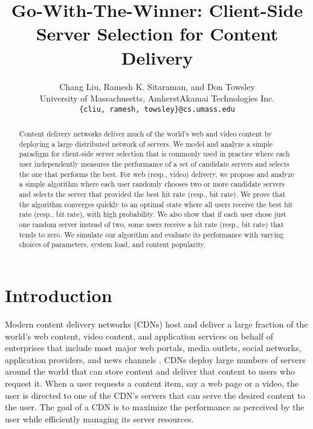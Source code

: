 \documentclass[conference]{IEEEtran}
\begin{document}
\title{Go-With-The-Winner: Client-Side Server Selection for Content Delivery}

\author{Chang Liu, Ramesh K. Sitaraman, and Don Towsley\\
University of Massachusetts, Amherst\hspace{0.2in}Akamai Technologies Inc.\\
\texttt{\{cliu, ramesh, towsley\}@cs.umass.edu}}



\maketitle

\begin{abstract}
Content delivery networks deliver much of the world's web and video content by deploying a large distributed network of servers. We model and analyze a simple paradigm for client-side server selection that is commonly used in practice  where each user independently measures the performance of a set of candidate servers and selects the one that performs the best. For web (resp., video) delivery, we propose and analyze a simple algorithm where each user randomly chooses two or more candidate servers and selects the server that provided the best hit rate (resp., bit rate). We prove that the algorithm converges quickly to an optimal state where all users receive the best hit rate (resp., bit rate), with high probability. We also show that if each user chose just one random server instead of two,  some users receive a hit rate (resp., bit rate) that tends to zero. We simulate our algorithm and evaluate its performance with varying choices of parameters, system load, and content popularity. 
\end{abstract}

\section{Introduction}
Modern content delivery networks (CDNs) host and deliver a large fraction of  the world's  web content, video content, and application services on behalf of enterprises that include most major web portals, media outlets, social networks, application providers, and news channels \cite{nygren2010akamai}.  CDNs deploy large numbers of servers around the world that can store content and deliver that content to users who request it. When a user requests  a content item, say a web page or a video,  the user is directed to one of  the CDN's servers that can serve the desired content to the user. The goal of a CDN is to maximize the performance as perceived by the user while efficiently managing its server resources.  
\end{document}
